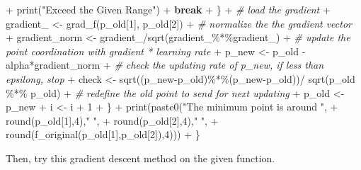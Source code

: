 \documentclass[
]{article}
\newenvironment{Shaded}{\begin{snugshade}}{\end{snugshade}}
\newcommand{\CommentTok}[1]{\textcolor[rgb]{0.56,0.35,0.01}{\textit{#1}}}
\newcommand{\ControlFlowTok}[1]{\textcolor[rgb]{0.13,0.29,0.53}{\textbf{#1}}}
\newcommand{\DecValTok}[1]{\textcolor[rgb]{0.00,0.00,0.81}{#1}}
\newcommand{\FunctionTok}[1]{\textcolor[rgb]{0.00,0.00,0.00}{#1}}
\newcommand{\NormalTok}[1]{#1}
\newcommand{\OtherTok}[1]{\textcolor[rgb]{0.56,0.35,0.01}{#1}}
\newcommand{\SpecialCharTok}[1]{\textcolor[rgb]{0.00,0.00,0.00}{#1}}
\newcommand{\StringTok}[1]{\textcolor[rgb]{0.31,0.60,0.02}{#1}}
\begin{document}
\begin{Shaded}
\begin{Highlighting}[]
\SpecialCharTok{+}       \FunctionTok{print}\NormalTok{(}\StringTok{"Exceed the Given Range"}\NormalTok{)}
\SpecialCharTok{+}       \ControlFlowTok{break}
\SpecialCharTok{+}\NormalTok{       \}}
\SpecialCharTok{+}     \CommentTok{\# load the gradient}
\SpecialCharTok{+}\NormalTok{     gradient\_ }\OtherTok{\textless{}{-}} \FunctionTok{grad\_f}\NormalTok{(p\_old[}\DecValTok{1}\NormalTok{], p\_old[}\DecValTok{2}\NormalTok{])}
\SpecialCharTok{+}     \CommentTok{\# normalize the the gradient vector}
\SpecialCharTok{+}\NormalTok{     gradient\_norm }\OtherTok{\textless{}{-}}\NormalTok{ gradient\_}\SpecialCharTok{/}\FunctionTok{sqrt}\NormalTok{(gradient\_}\SpecialCharTok{\%*\%}\NormalTok{gradient\_)}
\SpecialCharTok{+}     \CommentTok{\# update the point coordination with gradient * learning rate}
\SpecialCharTok{+}\NormalTok{     p\_new }\OtherTok{\textless{}{-}}\NormalTok{ p\_old }\SpecialCharTok{{-}}\NormalTok{ alpha}\SpecialCharTok{*}\NormalTok{gradient\_norm}
\SpecialCharTok{+}     \CommentTok{\# check the updating rate of p\_new, if less than epsilong, stop}
\SpecialCharTok{+}\NormalTok{     check }\OtherTok{\textless{}{-}} \FunctionTok{sqrt}\NormalTok{((p\_new}\SpecialCharTok{{-}}\NormalTok{p\_old)}\SpecialCharTok{\%*\%}\NormalTok{(p\_new}\SpecialCharTok{{-}}\NormalTok{p\_old))}\SpecialCharTok{/} \FunctionTok{sqrt}\NormalTok{(p\_old }\SpecialCharTok{\%*\%}\NormalTok{ p\_old)}
\SpecialCharTok{+}     \CommentTok{\# redefine the old point to send for next updating }
\SpecialCharTok{+}\NormalTok{     p\_old }\OtherTok{\textless{}{-}}\NormalTok{ p\_new}
\SpecialCharTok{+}\NormalTok{     i }\OtherTok{\textless{}{-}}\NormalTok{ i }\SpecialCharTok{+} \DecValTok{1}
\SpecialCharTok{+}\NormalTok{   \}}
\SpecialCharTok{+}   \FunctionTok{print}\NormalTok{(}\FunctionTok{paste0}\NormalTok{(}\StringTok{"The minimum point is around "}\NormalTok{, }
\SpecialCharTok{+}                \FunctionTok{round}\NormalTok{(p\_old[}\DecValTok{1}\NormalTok{],}\DecValTok{4}\NormalTok{),}\StringTok{" "}\NormalTok{,}
\SpecialCharTok{+}                \FunctionTok{round}\NormalTok{(p\_old[}\DecValTok{2}\NormalTok{],}\DecValTok{4}\NormalTok{),}\StringTok{" "}\NormalTok{,}
\SpecialCharTok{+}                \FunctionTok{round}\NormalTok{(}\FunctionTok{f\_original}\NormalTok{(p\_old[}\DecValTok{1}\NormalTok{],p\_old[}\DecValTok{2}\NormalTok{]),}\DecValTok{4}\NormalTok{)))}
\SpecialCharTok{+}\NormalTok{ \}}
\end{Highlighting}
\end{Shaded}

Then, try this gradient descent method on the given function.
\end{document}

